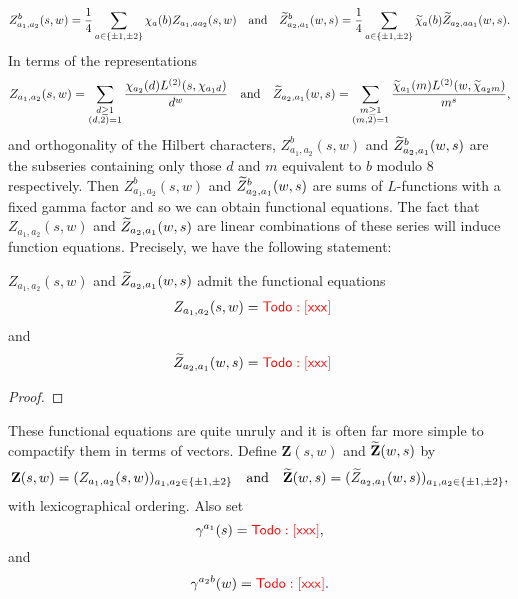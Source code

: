 \documentclass[12pt,reqno,oneside]{amsart}
\begin{document}
    \[
        Z_{a_{1},a_{2}}^{b}(s,w) = \frac{1}{4}\sum_{a \in \{\pm1,\pm2\}}\chi_{a}(b)Z_{a_{1},aa_{2}}(s,w) \quad \text{and} \quad \widetilde{Z}_{a_{2},a_{1}}^{b}(w,s) = \frac{1}{4}\sum_{a \in \{\pm1,\pm2\}}\widetilde{\chi}_{a}(b)\widetilde{Z}_{a_{2},aa_{1}}(w,s).
    \]
    In terms of the representations
    \[
        Z_{a_{1},a_{2}}(s,w) = \sum_{\substack{d \ge 1 \\ (d,2) = 1}}\frac{\chi_{a_{2}}(d)L^{(2)}(s,\chi_{a_{1}d})}{d^{w}} \quad \text{and} \quad \widetilde{Z}_{a_{2},a_{1}}(w,s) = \sum_{\substack{m \ge 1 \\ (m,2) = 1}}\frac{\widetilde{\chi}_{a_{1}}(m)L^{(2)}(w,\widetilde{\chi}_{a_{2}m})}{m^{s}},
    \]
    and orthogonality of the Hilbert characters, $Z_{a_{1},a_{2}}^{b}(s,w)$ and $\widetilde{Z}_{a_{2},a_{1}}^{b}(w,s)$ are the subseries containing only those $d$ and $m$ equivalent to $b$ modulo $8$ respectively. Then $Z_{a_{1},a_{2}}^{b}(s,w)$ and $\widetilde{Z}_{a_{2},a_{1}}^{b}(w,s)$ are sums of $L$-functions with a fixed gamma factor and so we can obtain functional equations. The fact that $Z_{a_{1},a_{2}}(s,w)$ and $\widetilde{Z}_{a_{2},a_{1}}(w,s)$ are linear combinations of these series will induce function equations. Precisely, we have the following statement:

    \begin{theorem}\label{thm:double_Dirichlet_series_functional_equation}
        $Z_{a_{1},a_{2}}(s,w)$ and $\widetilde{Z}_{a_{2},a_{1}}(w,s)$ admit the functional equations
        \begin{align*}
            Z_{a_{1},a_{2}}(s,w) &= \textcolor{red}{\sf Todo: [xxx]}
        \end{align*}
        and
        \begin{align*}
            \widetilde{Z}_{a_{2},a_{1}}(w,s) &= \textcolor{red}{\sf Todo: [xxx]}
        \end{align*}
    \end{theorem}
    \begin{proof}
    \end{proof}

    These functional equations are quite unruly and it is often far more simple to compactify them in terms of vectors. Define $\mathbf{Z}(s,w)$ and $\widetilde{\mathbf{Z}}(w,s)$ by
    \[
        \mathbf{Z}(s,w) = (Z_{a_{1},a_{2}}(s,w))_{a_{1},a_{2} \in \{\pm 1, \pm 2\}} \quad \text{and} \quad \widetilde{\mathbf{Z}}(w,s) = (\widetilde{Z}_{a_{2},a_{1}}(w,s))_{a_{1},a_{2} \in \{\pm 1, \pm 2\}},
    \]
    with lexicographical ordering. Also set
    \[
        \gamma^{a_{1}}(s) = \textcolor{red}{\sf Todo: [xxx]},
    \]
    and
    \[
        \gamma^{a_{2}b}(w) = \textcolor{red}{\sf Todo: [xxx]}.
    \]
  
\end{document}
